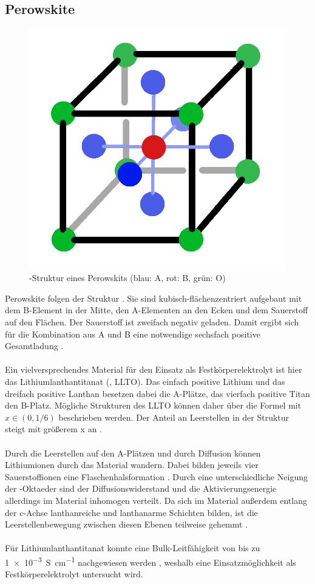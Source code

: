 \documentclass[a4paper, 11pt, headsepline,footsepline,twoside,abstract]{scrbook}
\begin{document}
\subsection{Perowskite}
\begin{figure}
	\centering
	\includegraphics[width=0.45\columnwidth]{images/Perowskit-Struktur.png}
	\caption{-Struktur eines Perowskits (blau: A, rot: B, grün: O)}
	\label{struktur-perowskit}
\end{figure}
Perowskite folgen der Struktur . Sie sind kubisch-flächenzentriert aufgebaut mit dem B-Element in der Mitte, den A-Elementen an den Ecken und dem Sauerstoff auf den Flächen. Der Sauerstoff ist zweifach negativ geladen. Damit ergibt sich für die Kombination aus A und B eine notwendige sechsfach positive Gesamtladung \cite{ishihara2009perovskite}.
\\\\
Ein vielversprechendes Material für den Einsatz als Festkörperelektrolyt ist hier das Lithiumlanthantitanat (, LLTO). Das einfach positive Lithium und das dreifach positive Lanthan besetzen dabei die A-Plätze, das vierfach positive Titan den B-Platz. Mögliche Strukturen des LLTO können daher über die Formel  mit $x \in (0, 1/6)$ beschrieben werden. Der Anteil an Leerstellen in der Struktur steigt mit größerem x an \cite{chen2015lithium}.
\\\\
Durch die Leerstellen auf den A-Plätzen und durch Diffusion können Lithiumionen durch das Material wandern. Dabei bilden jeweils vier Sauerstoffionen eine Flaschenhalsformation \cite{cao2014recent}. Durch eine unterschiedliche Neigung der -Oktaeder sind der Diffusionswiderstand und die Aktivierungsenergie allerdings im Material inhomogen verteilt. Da sich im Material außerdem entlang der c-Achse lanthanreiche und lanthanarme Schichten bilden, ist die Leerstellenbewegung zwischen diesen Ebenen teilweise gehemmt \cite{jay2015genetics}.
\\\\
Für Lithiumlanthantitanat konnte eine Bulk-Leitfähigkeit von bis zu \SI{1e-3}{\siemens\per\centi\metre} nachgewiesen werden \cite{stramare2003lithium}, weshalb eine Einsatzmöglichkeit als Festkörperelektrolyt untersucht wird.
\end{document}
